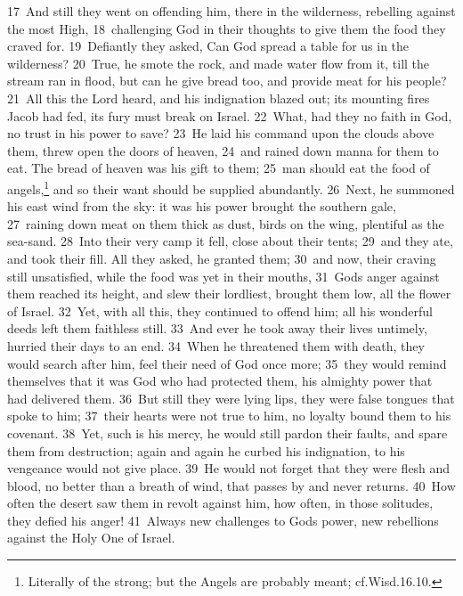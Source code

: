 \documentclass[10pt]{book} %
\begin{document}
\textcolor{benred8}{17}~And still they went on offending him, there in the wilderness, rebelling against the most High, \textcolor{benred8}{18}~challenging God in their thoughts to give them the food they craved for. \textcolor{benred8}{19}~Defiantly they asked, Can God spread a table for us in the wilderness? \textcolor{benred8}{20}~True, he smote the rock, and made water flow from it, till the stream ran in flood, but can he give bread too, and provide meat for his people? \textcolor{benred8}{21}~All this the Lord heard, and his indignation blazed out; its mounting fires Jacob had fed, its fury must break on Israel. \textcolor{benred8}{22}~What, had they no faith in God, no trust in his power to save? \textcolor{benred8}{23}~He laid his command upon the clouds above them, threw open the doors of heaven, \textcolor{benred8}{24}~and rained down manna for them to eat. The bread of heaven was his gift to them; \textcolor{benred8}{25}~man should eat the food of angels,\footnote[2]{Literally \textasciigrave of the strong\textquotesingle ; but the Angels are probably meant; cf.Wisd.16.10.} and so their want should be supplied abundantly. \textcolor{benred8}{26}~Next, he summoned his east wind from the sky: it was his power brought the southern gale, \textcolor{benred8}{27}~raining down meat on them thick as dust, birds on the wing, plentiful as the sea-sand. \textcolor{benred8}{28}~Into their very camp it fell, close about their tents; \textcolor{benred8}{29}~and they ate, and took their fill. All they asked, he granted them; \textcolor{benred8}{30}~and now, their craving still unsatisfied, while the food was yet in their mouths, \textcolor{benred8}{31}~God\textquotesingle s anger against them reached its height, and slew their lordliest, brought them low, all the flower of Israel.
\textcolor{benred8}{32}~Yet, with all this, they continued to offend him; all his wonderful deeds left them faithless still. \textcolor{benred8}{33}~And ever he took away their lives untimely, hurried their days to an end. \textcolor{benred8}{34}~When he threatened them with death, they would search after him, feel their need of God once more; \textcolor{benred8}{35}~they would remind themselves that it was God who had protected them, his almighty power that had delivered them. \textcolor{benred8}{36}~But still they were lying lips, they were false tongues that spoke to him; \textcolor{benred8}{37}~their hearts were not true to him, no loyalty bound them to his covenant. \textcolor{benred8}{38}~Yet, such is his mercy, he would still pardon their faults, and spare them from destruction; again and again he curbed his indignation, to his vengeance would not give place. \textcolor{benred8}{39}~He would not forget that they were flesh and blood, no better than a breath of wind, that passes by and never returns. \textcolor{benred8}{40}~How often the desert saw them in revolt against him, how often, in those solitudes, they defied his anger! \textcolor{benred8}{41}~Always new challenges to God\textquotesingle s power, new rebellions against the Holy One of Israel.
\end{document}
